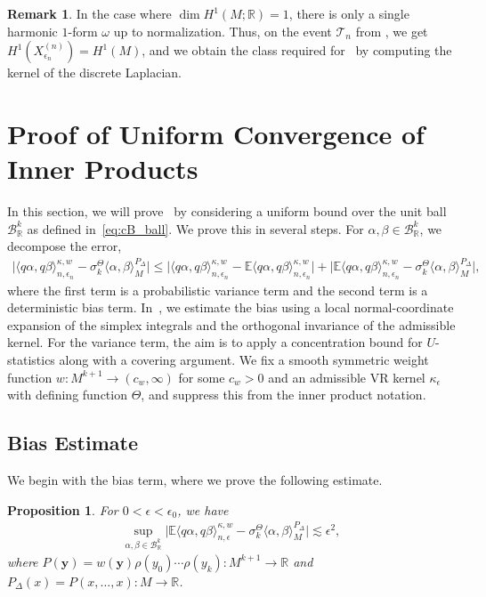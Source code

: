 \documentclass[11pt,reqno]{amsproc}
\numberwithin{equation}{section}
\newcommand{\R}{\mathbb{R}}
\newcommand{\E}{\mathbb{E}}
\newcommand{\by}{\mathbf{y}}
\newcommand{\cB}{\mathcal{B}}
\newcommand{\cT}{\mathcal{T}}
\newcommand{\ls}{\lesssim}
\newtheorem{proposition}[counter]{Proposition}
\theoremstyle{definition}
\newtheorem{remark}[counter]{Remark}
\theoremstyle{plain}
\begin{document}
    \begin{remark}
    In the case where $\dim H^1(M;\R)=1$, there is only a single harmonic $1$-form $\omega$ up to normalization. Thus, on the event $\cT_n$ from , we get $H^1(X^{(n)}_{\epsilon_n})=H^1(M)$, and we obtain the class required for~ by computing the kernel of the discrete Laplacian.
    \end{remark}



    \section{Proof of Uniform Convergence of Inner Products} \label{sec:uc_proof}
    In this section, we will prove~ by considering a uniform bound over the unit ball $\cB_\R^k$ as defined in~\eqref{eq:cB_ball}. 
    We prove this in several steps. For $\alpha, \beta \in \cB_\R^k$, we decompose the error,
    \begin{align} \label{eq:uc_bias_variance_decomposition}
        \Big|\langle q\alpha, q\beta\rangle^{\kappa,w}_{n, \epsilon_n} - \sigma^\Theta_k \langle \alpha, \beta \rangle_M^{P_\Delta}\Big| \leq \Big|\langle q\alpha, q\beta\rangle^{\kappa,w}_{n, \epsilon_n} - \E\langle q\alpha, q\beta\rangle^{\kappa,w}_{n,\epsilon_n}\Big| + \Big| \E\langle q\alpha, q\beta\rangle^{\kappa,w}_{n,\epsilon_n} - \sigma^\Theta_k \langle \alpha, \beta \rangle_M^{P_\Delta}\Big|,
    \end{align}
    where the first term is a probabilistic variance term and the second term is a deterministic bias term.  
    In~, we estimate the bias using a local normal-coordinate expansion of the simplex integrals and the orthogonal invariance of the admissible kernel. For the variance term, the aim is to apply a concentration bound for $U$-statistics along with a covering argument.
    We fix a smooth symmetric weight function $w: M^{k+1} \to (c_w,\infty)$ for some $c_w>0$ and an admissible VR kernel $\kappa_\epsilon$ with defining function $\Theta$, and suppress this from the inner product notation. 

    \subsection{Bias Estimate} \label{ssec:uc_bias}

    We begin with the bias term, where we prove the following estimate.
    \begin{proposition} \label{prop:uc_bias}
    For $0 < \epsilon < \epsilon_0$, we have
    \begin{align}
        \sup_{\alpha, \beta \in \cB_\R^k} \Big| \E\langle q\alpha, q\beta\rangle^{\kappa,w}_{n,\epsilon} - \sigma^\Theta_k \langle \alpha, \beta \rangle_M^{P_\Delta}\Big| \ls \epsilon^2,
    \end{align}
    where $P(\by) = w(\by)\rho(y_0) \cdots \rho(y_k) : M^{k+1} \to \R$ and $P_\Delta(x) = P(x,\ldots, x) : M \to \R$.
    \end{proposition}
\end{document}
